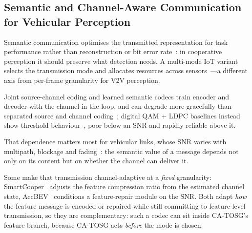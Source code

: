 \documentclass[journal]{IEEEtran}
\newcommand{\method}{CA-TOSG}
\begin{document}
\subsection{Semantic and Channel-Aware Communication for Vehicular Perception}

Semantic communication optimises the transmitted representation for task performance rather than reconstruction or bit error rate~\cite{sheng2024importance,gan2026scomcp,bourtsoulatze2019deepjscc}: in cooperative perception it should preserve what detection needs. A multi-mode IoT variant selects the transmission mode and allocates resources across sensors~\cite{yuan2025multimode}---a different axis from per-frame granularity for V2V perception.

Joint source-channel coding and learned semantic codecs train encoder and decoder with the channel in the loop, and can degrade more gracefully than separated source and channel coding~\cite{sheng2024importance,gan2026scomcp}; digital QAM + LDPC baselines instead show threshold behaviour~\cite{ieee80211bd}, poor below an SNR and rapidly reliable above it.

That dependence matters most for vehicular links, whose SNR varies with multipath, blockage and fading~\cite{ieee80211bd}: the semantic value of a message depends not only on its content but on whether the channel can deliver it.

Some make that transmission channel-adaptive at a \emph{fixed} granularity: SmartCooper~\cite{zhang2024smartcooper} adjusts the feature compression ratio from the estimated channel state, AccBEV~\cite{accbev2025} conditions a feature-repair module on the SNR. Both adapt \emph{how} the feature message is encoded or repaired while still committing to feature-level transmission, so they are complementary: such a codec can sit inside \method{}'s feature branch, because \method{} acts \emph{before} the mode is chosen.
\end{document}

